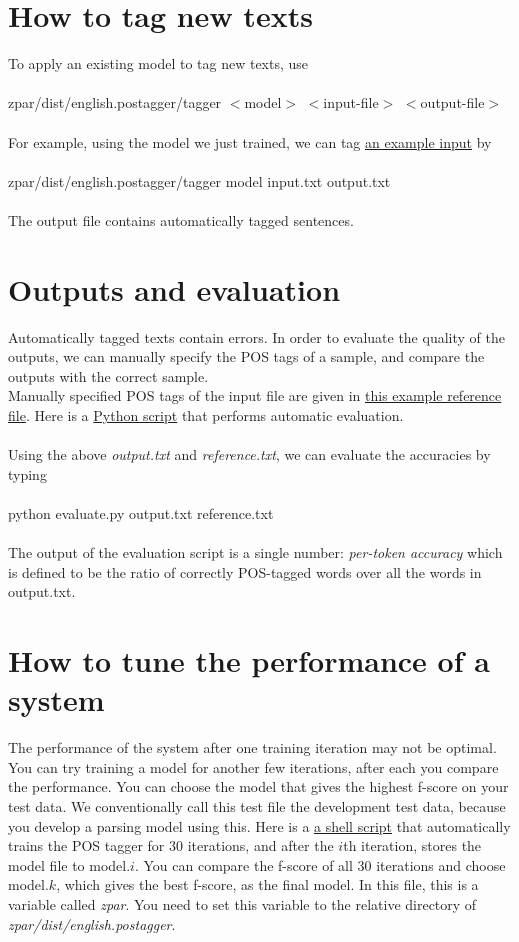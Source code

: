 \documentclass[12pt]{article}
\begin{document}
\begin{CJK}{GBK}{song}
\section{How to tag new texts}
To apply an existing model to tag new texts, use
\\
\\
\hspace{3cm} zpar/dist/english.postagger/tagger $<$model$>$ $<$input-file$>$ $<$output-file$>$
\\
\\
For example, using the model we just trained, we can tag \href{eng_pos_files/input.txt}{an example input} by
\\
\\
\hspace{3cm} zpar/dist/english.postagger/tagger model input.txt output.txt
\\
\\
The output file contains automatically tagged sentences.
\section{Outputs and evaluation}
Automatically tagged texts contain errors. In order to evaluate the quality of the outputs, we can manually specify the POS tags of a sample, and compare the outputs with the correct sample.
\\
Manually specified POS tags of the input file are given in \href{eng_pos_files/reference.txt}{this example reference file}. Here is a \href{eng_pos_files/evaluate.py}{Python script} that performs automatic evaluation. 
\\
\\
Using the above \textit{output.txt} and \textit{reference.txt}, we can evaluate the accuracies by typing
\\
\\
\hspace{3cm} python evaluate.py output.txt reference.txt
\\
\\
The output of the evaluation script is a single number: \textit{per-token accuracy} which is defined to be the ratio of correctly POS-tagged words over all the words in output.txt.
\section{How to tune the performance of a system}
\label{tuning}
The performance of the system after one training iteration may not be optimal. You can try training a model for another few iterations, after each you compare the performance. You can choose the model that gives the highest f-score on your test data. We conventionally call this test file the development test data, because you develop a parsing model using this. Here is a \href{eng_pos_files/test.sh}{a shell script} that automatically trains the POS tagger for 30 iterations, and after the $i$th iteration, stores the model file to model.$i$. You can compare the f-score of all 30 iterations and choose model.$k$, which gives the best f-score, as the final model. In this file, this is a variable called \textit{zpar}. You need to set this variable to the relative directory of \textit{zpar/dist/english.postagger}.

\end{CJK}
\end{document}
